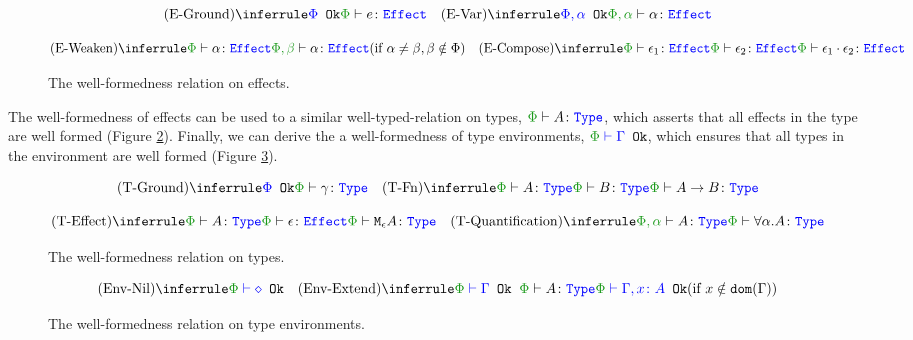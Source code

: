 \begin{figure}[H]
    \centering
    \begin{framed}
        \[
    \ntreeruleI{\eground}{\ok{\P}}{\wellformedeffect{\P}{e}}
    \quad
    \ntreeruleI{\evar}{\ok{\P,\a}}{\wellformedeffect{\P,\a}{\a}}
    \] 
    
    \[
    \condtreeruleI{\eweaken}{\wellformedeffect{\P}{\a}}{\wellformedeffect{\P,\b}{\a}}{\a\neq\b, \b\notin\P}
    \quad
    \ntreeruleII{\ecompose}{\wellformedeffect{\P}{\e_1}}{\wellformedeffect{\P}{\e_2}}{\wellformedeffect{\P}{\e_1\dot\e_2}}
\]
    \end{framed}
    
    \caption{The well-formedness relation on effects.}
    \label{EffectWellformednes}
\end{figure}



The well-formedness of effects can be used to a similar well-typed-relation on types, $\wellformedtype{\P}{A}$, which asserts that all effects in the type are well formed (Figure \ref{TypeWellformedness}). 
Finally, we can derive the a well-formedness of type environments,   $\oke{\P}{\G}$, which ensures that all types in the environment are well formed (Figure \ref{TypeEnvWellformedness}).

\begin{figure}[H]
    \centering
    \begin{framed}
        
\[
    \ntreeruleI{\tground}{\ok{\P}}{\wellformedtype{\P}{\g}}
    \quad
    \ntreeruleII{\tfun}{\wellformedtype{\P}{A}}{\wellformedtype{\P}{B}}{\wellformedtype{\P}{\ab}}
\] 

\[
    \ntreeruleII{\teffect}{\wellformedtype{\P}{A}}{\wellformedeffect{\P}{\e}}{\wellformedtype{\P}{\mea}}
    \quad
    \ntreeruleI{\tquant}{\wellformedtype{\P,\a}{A}}{\wellformedtype{\P}{\all{\a}{A}}}
\]
    \end{framed}    
    \caption{The well-formedness relation on types.}
    \label{TypeWellformedness}
\end{figure}

\begin{figure}[H]
    \centering
\begin{framed}
    \[
        \ntreerulez{\envnil}{\oke{\P}{\nil}}
        \quad
        \condtreeruleI{\envextend}{\oke{\P}{\G}\s\s \wellformedtype{\P}{A}}{\oke{\P}{\gax}}{x\notin\dom{\G}}
    \]    
\end{framed}
    \caption{The well-formedness relation on type environments.}
    \label{TypeEnvWellformedness}
\end{figure}

